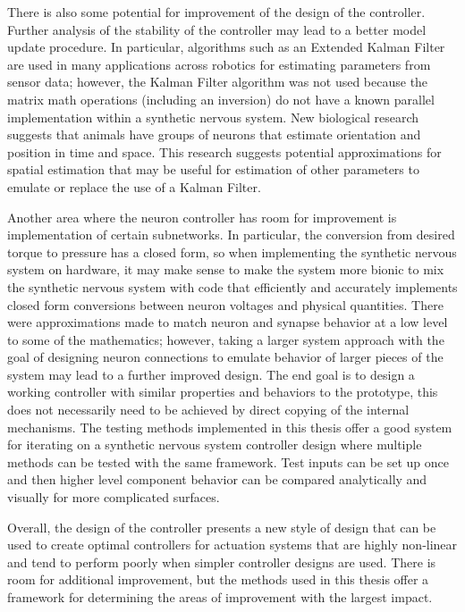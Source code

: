 There is also some potential for improvement of the design of the controller.
Further analysis of the stability of the controller may lead to a better model
update procedure. In particular, algorithms such as an Extended Kalman Filter
are used in many applications across robotics for estimating parameters from
sensor data; however, the Kalman Filter algorithm was not used because the matrix math operations (including an inversion) do
not have a known parallel implementation within a synthetic nervous system.
New biological research %
suggests that animals have groups of neurons that estimate orientation and
position in time and space. This research suggests potential approximations for
spatial estimation that may be useful for estimation of other parameters to
emulate or replace the use of a Kalman Filter.

Another area where the neuron controller has room for improvement is
implementation of certain subnetworks. In particular, the conversion from desired torque to pressure has a closed form, so
when implementing the synthetic nervous system on hardware, it may make sense to make the system more bionic to mix the synthetic nervous system
with code that efficiently and accurately implements closed form conversions between neuron voltages and physical quantities.
There were approximations made to match neuron
and synapse behavior at a low level to some of the mathematics; however, taking
a larger system approach with the goal of designing neuron connections to emulate
behavior of larger pieces of the system may lead to a further improved design.
The end goal is to design a working controller with similar properties and behaviors to the prototype, this
does not necessarily need to be achieved by direct copying of the internal mechanisms. The testing methods implemented
in this thesis offer a good system for iterating on a synthetic nervous system controller design where multiple methods
can be tested with the same framework. Test
inputs can be set up once and then higher level component behavior can be
compared analytically and visually for more complicated surfaces.

Overall, the design of the controller presents a new style of design that can be
used to create optimal controllers for actuation systems that are highly
non-linear and tend to perform poorly when simpler controller designs are used.
There is room for additional improvement, but the methods used in this thesis offer a
framework for determining the areas of improvement with the largest impact.
